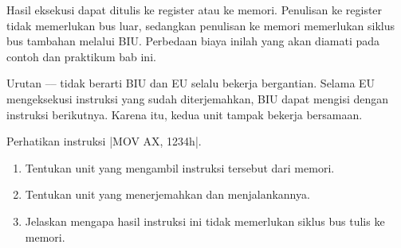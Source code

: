 Hasil eksekusi dapat ditulis ke register atau ke memori. Penulisan
ke register tidak memerlukan bus luar, sedangkan penulisan ke memori
memerlukan siklus bus tambahan melalui BIU. Perbedaan biaya inilah
yang akan diamati pada contoh dan praktikum bab ini.

\begin{infobox}
\vspace{1.1em}
Urutan ---- tidak berarti BIU
dan EU selalu bekerja bergantian. Selama EU mengeksekusi instruksi
yang sudah diterjemahkan, BIU dapat mengisi  dengan
instruksi berikutnya. Karena itu, kedua unit tampak bekerja
bersamaan.
\end{infobox}

\begin{aktivitasbox}
\vspace{1.1em}
Perhatikan instruksi \lstasm|MOV AX, 1234h|.
\begin{enumerate}
    \item Tentukan unit yang mengambil instruksi tersebut dari
          memori.
    \item Tentukan unit yang menerjemahkan dan menjalankannya.
    \item Jelaskan mengapa hasil instruksi ini tidak memerlukan
          siklus bus tulis ke memori.
\end{enumerate}
\end{aktivitasbox}
